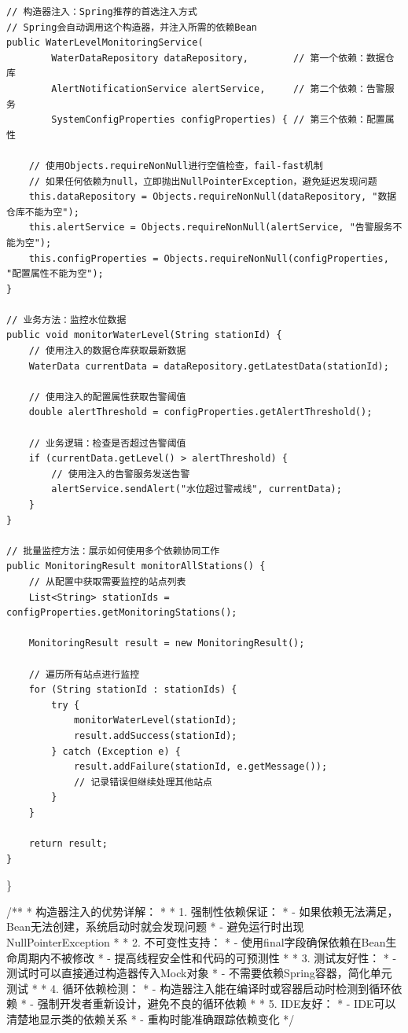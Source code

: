 \begin{verbatim}
// 构造器注入：Spring推荐的首选注入方式
// Spring会自动调用这个构造器，并注入所需的依赖Bean
public WaterLevelMonitoringService(
        WaterDataRepository dataRepository,        // 第一个依赖：数据仓库
        AlertNotificationService alertService,     // 第二个依赖：告警服务
        SystemConfigProperties configProperties) { // 第三个依赖：配置属性
    
    // 使用Objects.requireNonNull进行空值检查，fail-fast机制
    // 如果任何依赖为null，立即抛出NullPointerException，避免延迟发现问题
    this.dataRepository = Objects.requireNonNull(dataRepository, "数据仓库不能为空");
    this.alertService = Objects.requireNonNull(alertService, "告警服务不能为空");  
    this.configProperties = Objects.requireNonNull(configProperties, "配置属性不能为空");
}

// 业务方法：监控水位数据
public void monitorWaterLevel(String stationId) {
    // 使用注入的数据仓库获取最新数据
    WaterData currentData = dataRepository.getLatestData(stationId);
    
    // 使用注入的配置属性获取告警阈值
    double alertThreshold = configProperties.getAlertThreshold();
    
    // 业务逻辑：检查是否超过告警阈值
    if (currentData.getLevel() > alertThreshold) {
        // 使用注入的告警服务发送告警
        alertService.sendAlert("水位超过警戒线", currentData);
    }
}

// 批量监控方法：展示如何使用多个依赖协同工作
public MonitoringResult monitorAllStations() {
    // 从配置中获取需要监控的站点列表
    List<String> stationIds = configProperties.getMonitoringStations();
    
    MonitoringResult result = new MonitoringResult();
    
    // 遍历所有站点进行监控
    for (String stationId : stationIds) {
        try {
            monitorWaterLevel(stationId);
            result.addSuccess(stationId);
        } catch (Exception e) {
            result.addFailure(stationId, e.getMessage());
            // 记录错误但继续处理其他站点
        }
    }
    
    return result;
}
\end{verbatim}

\}

/** * 构造器注入的优势详解： * * 1. 强制性依赖保证： * - 如果依赖无法满足，Bean无法创建，系统启动时就会发现问题 * - 避免运行时出现NullPointerException * * 2. 不可变性支持： * - 使用final字段确保依赖在Bean生命周期内不被修改 * - 提高线程安全性和代码的可预测性 * * 3. 测试友好性： * - 测试时可以直接通过构造器传入Mock对象 * - 不需要依赖Spring容器，简化单元测试 * * 4. 循环依赖检测： * - 构造器注入能在编译时或容器启动时检测到循环依赖 * - 强制开发者重新设计，避免不良的循环依赖 * * 5. IDE友好： * - IDE可以清楚地显示类的依赖关系 * - 重构时能准确跟踪依赖变化 */

